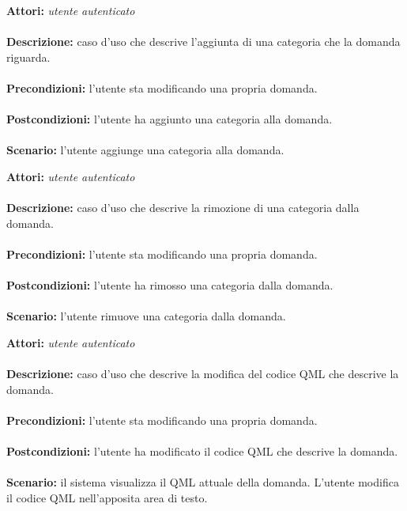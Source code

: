 \documentclass[a4paper,11pt]{article}
\begin{document}

\textbf{Attori:} \textit{utente autenticato}
\\ \\
\textbf{Descrizione:} caso d'uso che descrive l'aggiunta di una categoria che la domanda riguarda.\\
\\
\textbf{Precondizioni:} l'utente sta modificando una propria domanda.\\
\\
\textbf{Postcondizioni:} l’utente ha aggiunto una categoria alla domanda.\\
\\
\textbf{Scenario:} l’utente aggiunge una categoria alla domanda.\\



\textbf{Attori:} \textit{utente autenticato}
\\ \\
\textbf{Descrizione:} caso d'uso che descrive la rimozione di una categoria dalla domanda.\\
\\
\textbf{Precondizioni:} l'utente sta modificando una propria domanda.\\
\\
\textbf{Postcondizioni:} l’utente ha rimosso una categoria dalla domanda.\\
\\
\textbf{Scenario:} l’utente rimuove una categoria dalla domanda.\\



\textbf{Attori:} \textit{utente autenticato}
\\ \\
\textbf{Descrizione:} caso d'uso che descrive la modifica del codice QML che descrive la domanda.\\
\\
\textbf{Precondizioni:} l'utente sta modificando una propria domanda.\\
\\
\textbf{Postcondizioni:} l’utente ha modificato il codice QML che descrive la domanda.\\
\\
\textbf{Scenario:} il sistema visualizza il QML attuale della domanda. L’utente modifica il codice QML nell'apposita area di testo.\\
\end{document}

